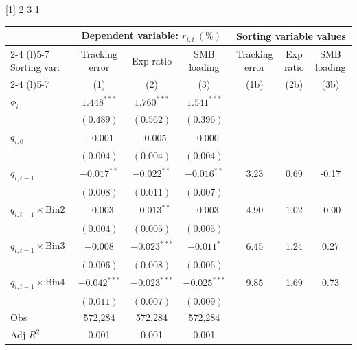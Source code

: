 \documentclass[
]{article}
\author{}
\date{\vspace{-2.5em}}
\begin{document}
{[}1{]} 2 3 1

\begin{tabular}{lcccccc}
  \toprule & \multicolumn{3}{c}{Dependent variable: $r_{i,t}~(\%)$ } & \multicolumn{3}{c}{Sorting variable values} \\
 \cmidrule(l){2-4} \cmidrule(l){5-7}
    Sorting var: & Tracking error & Exp ratio & SMB loading & Tracking error & Exp ratio & SMB loading \\
 \cmidrule(l){2-4} \cmidrule(l){5-7}  \vspace{5pt} & (1) & (2) & (3) & (1b) & (2b) & (3b) \\ 
  $\phi_i$ & $1.448^{***}$ & $1.760^{***}$ & $1.541^{***}$ &  &  &  \\ 
   & $(0.489)$ & $(0.562)$ & $(0.396)$ &  &  &  \\ 
  $q_{i,0}$ & $-0.001$ & $-0.005$ & $-0.000$ &  &  &  \\ 
   & $(0.004)$ & $(0.004)$ & $(0.004)$ &  &  &  \\ 
  $q_{i,t-1}$ & $-0.017^{**}$ & $-0.022^{**}$ & $-0.016^{**}$ & 3.23 & 0.69 & -0.17 \\ 
   & $(0.008)$ & $(0.011)$ & $(0.007)$ &  &  &  \\ 
  $q_{i,t-1} \times \text{Bin2}$ & $-0.003$ & $-0.013^{**}$ & $-0.003$ & 4.90 & 1.02 & -0.00 \\ 
   & $(0.004)$ & $(0.005)$ & $(0.005)$ &  &  &  \\ 
  $q_{i,t-1} \times \text{Bin3}$ & $-0.008$ & $-0.023^{***}$ & $-0.011^{*}$ & 6.45 & 1.24 & 0.27 \\ 
   & $(0.006)$ & $(0.008)$ & $(0.006)$ &  &  &  \\ 
  $q_{i,t-1} \times \text{Bin4}$ & $-0.042^{***}$ & $-0.023^{***}$ & $-0.025^{***}$ & 9.85 & 1.69 & 0.73 \\ 
   \vspace{5pt} & $(0.011)$ & $(0.007)$ & $(0.009)$ &  &  &  \\ 
  Obs & 572,284 & 572,284 & 572,284 &  &  &  \\ 
  Adj $R^2$ & 0.001 & 0.001 & 0.001 &  &  &  \\ 
   \bottomrule 
\end{tabular}
\end{document}
